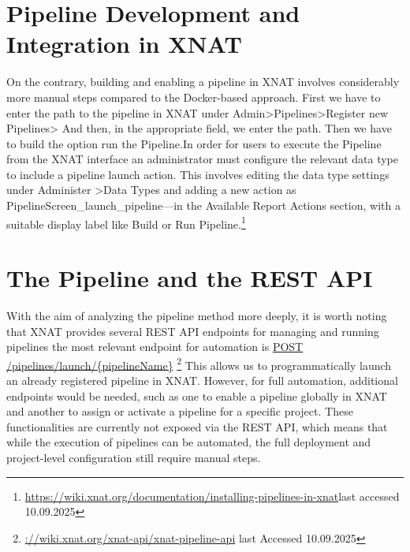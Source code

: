 \section{Pipeline Development and Integration in XNAT}
On the contrary, building and enabling a pipeline in XNAT involves considerably more manual steps compared to the Docker-based approach.
First we have to enter the path to the pipeline in XNAT under Admin>Pipelines>Register new Pipelines> And then, in the appropriate field, we enter the path. Then we have to build the option run the Pipeline.In order for users to execute the Pipeline from the XNAT interface an administrator must configure the relevant data type to include a pipeline launch action. This involves editing the data type settings under Administer >Data Types and adding a new action as PipelineScreen\_launch\_pipeline—in the Available Report Actions section, with a suitable display label like Build or Run Pipeline.\footnote{\url{https://wiki.xnat.org/documentation/installing-pipelines-in-xnat}last accessed 10.09.2025}

\section{The Pipeline and the REST API}
With the aim of analyzing the pipeline method more deeply, it is worth noting that XNAT provides several REST API endpoints for managing and running pipelines the most relevant endpoint for automation is \url{POST /pipelines/launch/{pipelineName}} \footnote{\url{://wiki.xnat.org/xnat-api/xnat-pipeline-api} last Accessed 10.09.2025}
This allows us to programmatically launch an already registered pipeline in XNAT. However, for full
automation, additional endpoints would be needed, such as one to enable a pipeline globally in XNAT and
another to assign or activate a pipeline for a specific project. These functionalities are currently not exposed via
the REST API, which means that while the execution of pipelines can be automated, the full deployment and
project-level configuration still require manual steps.

